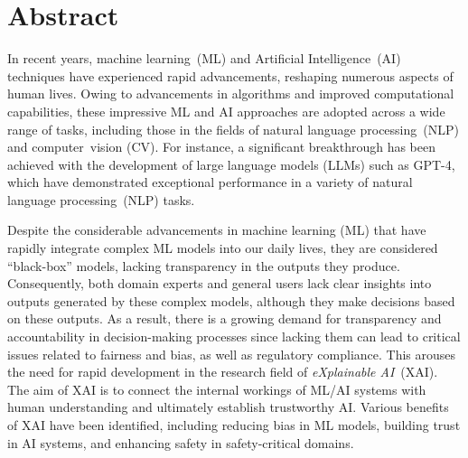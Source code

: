 

\section*{Abstract}

In recent years, machine learning~(ML) and Artificial Intelligence~(AI) techniques have
experienced rapid advancements, reshaping numerous aspects of human lives.
%
Owing to advancements in algorithms and improved computational capabilities, 
these impressive ML and AI approaches are adopted across a wide range of tasks, 
including those in the fields of natural language processing~(NLP) and computer~vision (CV).
%
For instance, a significant breakthrough has been achieved with the development of 
large language models (LLMs) such as GPT-4, which have demonstrated exceptional 
performance in a variety of natural language processing~(NLP) tasks.

Despite the considerable advancements in machine learning (ML) that 
have rapidly integrate complex ML models into our daily lives, 
they are considered ``black-box'' models, lacking transparency in the outputs they produce. 
%
Consequently, both domain experts and general users lack 
clear insights into outputs generated by these complex models, 
although they make decisions based on these outputs.
%
As a result, there is a growing demand for transparency and accountability in 
decision-making processes since lacking them can lead to critical issues related to fairness and bias, 
as well as regulatory compliance. 
%
This arouses the need for rapid development in the research field of \emph{eXplainable AI}~(XAI).
%
The aim of XAI is to connect the internal workings of ML/AI systems with human understanding
and ultimately establish trustworthy AI.
%
Various benefits of XAI have been identified, including reducing bias in ML models,
building trust in AI systems, and enhancing safety in safety-critical domains.

